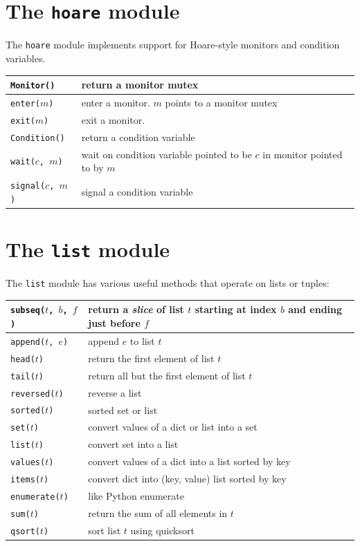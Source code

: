 \documentclass{report}
\begin{document}
\section{The \texttt{hoare} module}
\label{ap:hoare}

%
The \texttt{hoare} module implements support for Hoare-style monitors
and condition variables.

\vspace{1em}
\begin{tabular}{|l|l|}
\hline
\texttt{Monitor()} & return a monitor mutex\\
\hline
\texttt{enter($m$)} & enter a monitor.  $m$ points to a monitor mutex\\
\hline
\texttt{exit($m$)} & exit a monitor.\\
\hline
\texttt{Condition()} & return a condition variable\\
\hline
\texttt{wait($c$, $m$)} & wait on condition variable pointed to be $c$ in monitor pointed to by $m$\\
\hline
\texttt{signal($c$, $m$)} & signal a condition variable\\
\hline
\end{tabular}

\section{The \texttt{list} module}
\label{ap:list}

%
The \texttt{list} module has various useful methods that operate on lists
or tuples:

\vspace{1em}
\begin{tabular}{|l|l|}
\hline
\texttt{subseq($t$, $b$, $f$)} & return a \emph{slice} of list $t$ starting
at index $b$ and ending just before $f$\\
\hline
\texttt{append($t$, $e$)} & append $e$ to list $t$\\
\hline
\texttt{head($t$)} & return the first element of list $t$\\
\hline
\texttt{tail($t$)} & return all but the first element of list $t$\\
\hline
\texttt{reversed($t$)} & reverse a list \\
\hline
\texttt{sorted($t$)} & sorted set or list \\
\hline
\texttt{set($t$)} & convert values of a dict or list into a set \\
\hline
\texttt{list($t$)} & convert set into a list \\
\hline
\texttt{values($t$)} & convert values of a dict into a list sorted by key \\
\hline
\texttt{items($t$)} & convert dict into (key, value) list sorted by key \\
\hline
\texttt{enumerate($t$)} & like Python enumerate \\
\hline
\texttt{sum($t$)} & return the sum of all elements in $t$\\
\hline
\texttt{qsort($t$)} & sort list $t$ using quicksort\\
\hline
\end{tabular}
\end{document}

